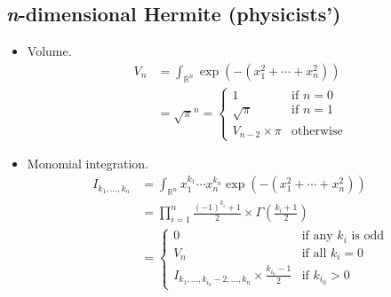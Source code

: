 \documentclass[draft]{scrartcl}
\begin{document}
\subsection*{\textit{n}-dimensional Hermite (physicists')}
\begin{itemize}
  \item Volume.
\begin{align}\nonumber
  V_n
  &= \int_{\mathbb{R}^n} \exp\left(-(x_1^2+\cdots+x_n^2)\right)\\
  &= \sqrt{\pi}^n
   = \begin{cases}
     1&\text{if $n=0$}\\
     \sqrt{\pi}&\text{if $n=1$}\\
     V_{n-2} \times \pi&\text{otherwise}
   \end{cases}
\end{align}

  \item Monomial integration.
\begin{align}\nonumber
    I_{k_1,\dots,k_n}
    &= \int_{\mathbb{R}^n} x_1^{k_1}\cdots x_n^{k_n} \exp(-(x_1^2+\cdots+x_n^2))\\
    &= \prod_{i=1}^n \frac{(-1)^{k_i} + 1}{2} \times \Gamma\left(\frac{k_i+1}{2}\right)\\
    &=\begin{cases}
      0&\text{if any $k_i$ is odd}\\
      V_n&\text{if all $k_i=0$}\\
      I_{k_1,\dots,k_{i_0}-2,\dots,k_n} \times \frac{k_{i_0} - 1}{2}&\text{if $k_{i_0} > 0$}
    \end{cases}
\end{align}
\end{itemize}
\end{document}
